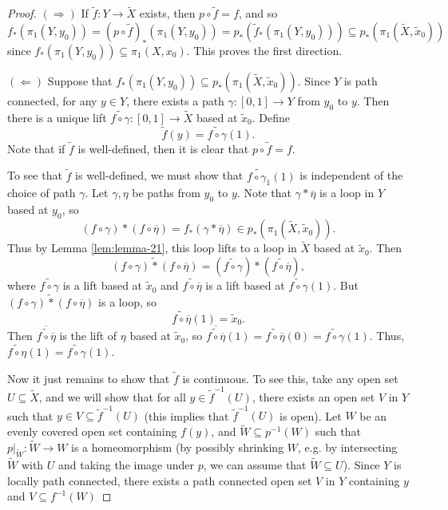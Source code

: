 \begin{proof}
  $(\Rightarrow)$ If $\widetilde{f} : Y \to \widetilde{X}$
  exists, then $p \circ \widetilde{f} = f$, and so
  \[
    f_*(\pi_1(Y, y_0))
    = (p \circ \widetilde{f})_*(\pi_1(Y, y_0))
    = p_*(\widetilde{f}_*(\pi_1(Y, y_0)))
    \subseteq p_*(\pi_1(\widetilde{X}, \widetilde{x}_0))
  \]
  since $f_*(\pi_1(Y, y_0)) \subseteq \pi_1(X, x_0)$. This
  proves the first direction.

  $(\Leftarrow)$ Suppose that
  $f_*(\pi_1(Y, y_0)) \subseteq p_*(\pi_1(\widetilde{X}, \widetilde{x}_0))$.
  Since $Y$ is path connected, for any $y \in Y$, there exists
  a path $\gamma : [0, 1] \to Y$ from $y_0$ to $y$.
  Then there is a unique lift $\widetilde{f \circ \gamma} : [0, 1] \to \widetilde{X}$
  based at $\widetilde{x}_0$. Define
  \[
    \widetilde{f}(y) = \widetilde{f \circ \gamma}(1).
  \]
  Note that if $\widetilde{f}$ is well-defined, then it is
  clear that $p \circ \widetilde{f} = f$.

  To see that $\widetilde{f}$ is well-defined, we must show
  that $\widetilde{f \circ \gamma_1}(1)$ is independent
  of the choice of path $\gamma$. Let
  $\gamma, \eta$ be paths from $y_0$ to $y$. Note that
  $\gamma * \overline{\eta}$ is a loop in $Y$ based at $y_0$,
  so
  \[
    (f \circ \gamma) * (f \circ \overline{\eta})
    = f_*(\gamma * \overline{\eta})
    \in p_*(\pi_1(\widetilde{X}, \widetilde{x}_0)).
  \]
  Thus by Lemma \ref{lem:lemma-21}, this loop lifts
  to a loop in $\widetilde{X}$ based at $\widetilde{x}_0$. Then
  \[
    \widetilde{(f \circ \gamma) * (f \circ \overline{\eta})}
    = (\widetilde{f \circ \gamma}) * (\widetilde{f \circ \overline{\eta}}),
  \]
  where $\widetilde{f \circ \gamma}$ is a lift based
  at $\widetilde{x}_0$ and $\widetilde{f \circ \overline{\eta}}$ is a lift
  based at $\widetilde{f \circ \gamma}(1)$. But
  $\widetilde{(f \circ \gamma) * (f \circ \overline{\eta})}$
  is a loop, so
  \[
    \widetilde{f \circ \overline{\eta}}(1) = \widetilde{x}_0.
  \]
  Then $\overline{\widetilde{f \circ \overline{\eta}}}$
  is the lift of $\eta$ based at $\widetilde{x}_0$, so
  $\overline{\widetilde{f \circ \overline{\eta}}}(1)
    = \widetilde{f \circ \overline{\eta}}(0)
    = \widetilde{f \circ \gamma}(1)$.
  Thus, $\widetilde{f \circ \eta}(1) = \widetilde{f \circ \gamma}(1)$.

  Now it just remains to show that $\widetilde{f}$ is
  continuous. To see this, take any open set
  $U \subseteq \widetilde{X}$, and we will show that
  for all $y \in \widetilde{f}^{-1}(U)$, there exists an
  open set $V$ in $Y$ such that $y \in V \subseteq \widetilde{f}^{-1}(U)$ (this implies that
  $\widetilde{f}^{-1}(U)$ is open). Let $W$ be an evenly
  covered open set containing $f(y)$, and $\widetilde{W} \subseteq p^{-1}(W)$ such that
  $p|_{\widetilde{W}} : \widetilde{W} \to W$ is a homeomorphism
  (by possibly shrinking $W$, e.g. by intersecting
  $\widetilde{W}$ with $U$ and taking the image under $p$, we
  can assume that $\widetilde{W} \subseteq U$). Since
  $Y$ is locally path connected, there exists a path
  connected open set $V$ in $Y$ containing $y$ and
  $V \subseteq f^{-1}(W)$


\end{proof}
